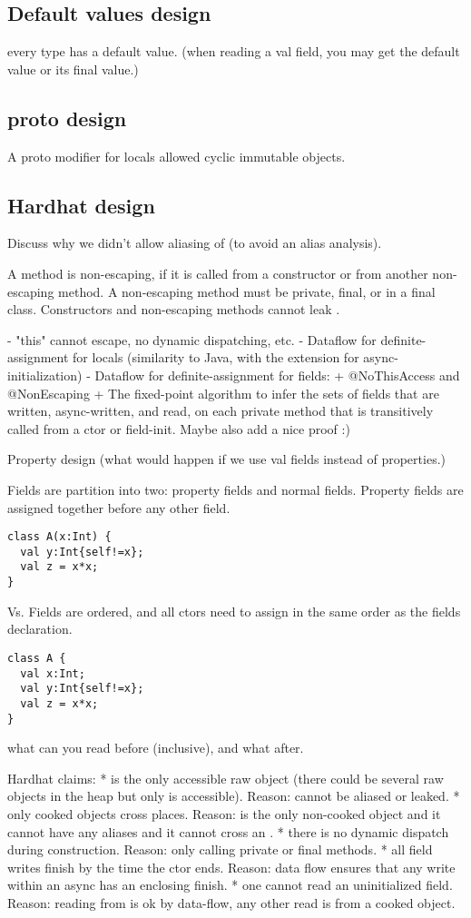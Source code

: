 

\subsection{Default values design}
every type has a default value.
(when reading a val field, you may get the default value or its final value.)

\subsection{proto design}
A proto modifier for locals
allowed cyclic immutable objects.

\subsection{Hardhat design}
\label{Section:hardhat}

Discuss why we didn't allow aliasing of \this (to avoid an alias analysis).

A method is non-escaping, if it is called from a constructor or from another non-escaping method.
A non-escaping method must be private, final, or in a final class.
Constructors and non-escaping methods cannot leak \this.


- "this" cannot escape, no dynamic dispatching, etc.
- Dataflow for definite-assignment for locals (similarity to Java, with the extension for async-initialization)
- Dataflow for definite-assignment for fields:
  + @NoThisAccess and @NonEscaping
  + The fixed-point algorithm to infer the sets of fields that are written, async-written, and read, on each private method that is transitively called from a ctor or field-init. Maybe also add a nice proof :)


Property design (what would happen if we use val fields instead of properties.)

Fields are partition into two: property fields and normal fields. Property fields are assigned together before any other field.
\begin{lstlisting}
class A(x:Int) {
  val y:Int{self!=x};
  val z = x*x;
}
\end{lstlisting}
Vs.
Fields are ordered, and all ctors need to assign in the same order as the fields declaration.
\begin{lstlisting}
class A {
  val x:Int;
  val y:Int{self!=x};
  val z = x*x;
}
\end{lstlisting}



what can you read before (inclusive), and what after.


Hardhat claims:
* \this is the only accessible raw object (there could be several raw objects in the heap but only \this is accessible). Reason: \this cannot be aliased or leaked.
* only cooked objects cross places. Reason: \this is the only non-cooked object and it cannot have any aliases and it cannot cross an .
* there is no dynamic dispatch during construction. Reason: only calling private or final methods.
* all field writes finish by the time the ctor ends. Reason: data flow ensures that any write within an async has an enclosing finish.
* one cannot read an uninitialized field. Reason: reading from \this is ok by data-flow, any other read is from a cooked object.
